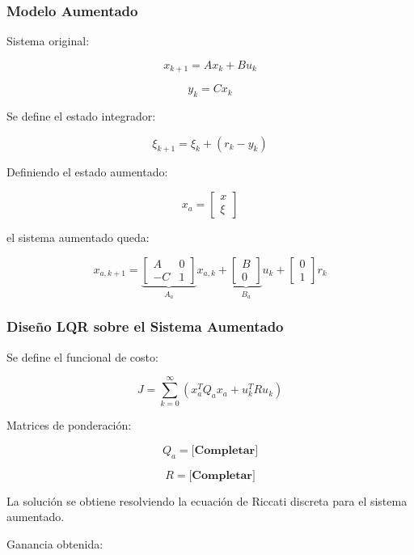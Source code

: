 
\subsubsection{Modelo Aumentado}

Sistema original:

\[
x_{k+1} = Ax_k + Bu_k
\]

\[
y_k = Cx_k
\]

Se define el estado integrador:

\[
\xi_{k+1} = \xi_k + (r_k - y_k)
\]

Definiendo el estado aumentado:

\[
x_a =
\begin{bmatrix}
	x \\
	\xi
\end{bmatrix}
\]

el sistema aumentado queda:

\[
x_{a,k+1} =
\underbrace{
	\begin{bmatrix}
		A & 0 \\
		-C & 1
	\end{bmatrix}
}_{A_a}
x_{a,k}
+
\underbrace{
	\begin{bmatrix}
		B \\
		0
	\end{bmatrix}
}_{B_a}
u_k
+
\begin{bmatrix}
	0 \\
	1
\end{bmatrix}
r_k
\]


\subsubsection{Diseño LQR sobre el Sistema Aumentado}

Se define el funcional de costo:

\[
J=\sum_{k=0}^{\infty}
\left(
x_a^T Q_a x_a + u_k^T R u_k
\right)
\]

Matrices de ponderación:

\[
Q_a = \textbf{[Completar]}
\]

\[
R = \textbf{[Completar]}
\]

La solución se obtiene resolviendo la ecuación de Riccati discreta
para el sistema aumentado.

Ganancia obtenida:


